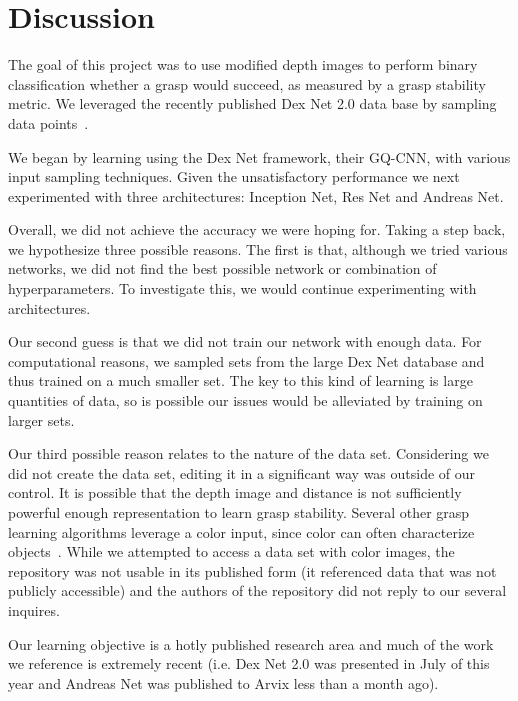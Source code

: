 
\section{Discussion}
\label{sec:discussion}

The goal of this project was to use modified depth images to perform binary classification whether a grasp would succeed, as measured by a grasp stability metric. 
We leveraged the recently published Dex Net 2.0 data base by sampling data points~\cite{mahler2017dex}. 

We began by learning using the Dex Net framework, their GQ-CNN, with various input sampling techniques. 
Given the unsatisfactory performance we next experimented with three architectures: Inception Net, Res Net and Andreas Net. 

Overall, we did not achieve the accuracy we were hoping for. 
Taking a step back, we hypothesize three possible reasons. 
The first is that, although we tried various networks, we did not find the best possible network or combination of hyperparameters. 
To investigate this, we would continue experimenting with architectures. 

Our second guess is that we did not train our network with enough data. 
For computational reasons, we sampled sets from the large Dex Net database and thus trained on a much smaller set. 
The key to this kind of learning is large quantities of data, so is possible our issues would be alleviated by training on larger sets. 

Our third possible reason relates to the nature of the data set. 
Considering we did not create the data set, editing it in a significant way was outside of our control. 
It is possible that the depth image and distance is not sufficiently powerful enough representation to learn grasp stability. 
Several other grasp learning algorithms leverage a color input, since color can often characterize objects~\cite{zeng2017robotic}.  
While we attempted to access a data set with color images, the repository was not usable in its published form (it referenced data that was not publicly accessible) and the authors of the repository did not reply to our several inquires. 

Our learning objective is a hotly published research area and much of the work we reference is extremely recent (i.e. Dex Net 2.0 was presented in July of this year and Andreas Net was published to Arvix less than a month ago). 